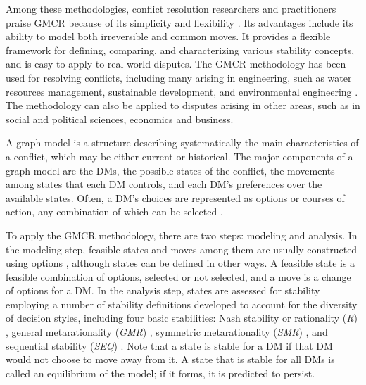 Among these methodologies, conflict resolution researchers and practitioners praise GMCR because of its simplicity and flexibility \citep{Kilgour&Hipel2005}. Its advantages include its ability to model both irreversible and common moves. It provides a flexible framework for defining, comparing, and characterizing various stability concepts, and is easy to apply to real-world disputes. The GMCR methodology has been used for resolving conflicts, including many arising in engineering, such as water resources management, sustainable development, and environmental engineering \citep{Hipel-et-al2001, Hipel-et-al2008a, Hipel-et-al2008b, Hipel&Obeidi2005, Kilgour&Hipel2005}. The methodology can also be applied to disputes arising in other areas, such as in social and political sciences, economics and business.

A graph model is a structure describing systematically the main characteristics of a conflict, which may be either current or historical. The major components of a graph model are the DMs, the possible states of the conflict, the movements among states that each DM controls, and each DM's preferences over the available states. Often, a DM's choices are represented as options or courses of action, any combination of which can be selected \citep{Howard1971, Kilgour-et-al1987, Fang-et-al1993}.

To apply the GMCR methodology, there are two steps: modeling and analysis. In the modeling step, feasible states and moves among them are usually constructed using options \citep{Kilgour-et-al1987, Fang-et-al1993}, although states can be defined in other ways. A feasible state is a feasible combination of options, selected or not selected, and a move is a change of options for a DM. In the analysis step, states are assessed for stability employing a number of stability definitions developed to account for the diversity of decision styles, including four basic stabilities: Nash stability or rationality (\emph{R}) \citep{Nash1950, Nash1951}, general metarationality (\emph{GMR}) \citep{Howard1971}, symmetric metarationality (\emph{SMR}) \citep{Howard1971}, and sequential stability (\emph{SEQ}) \citep{Fraser&Hipel1984}. Note that a state is stable for a DM if that DM would not choose to move away from it. A state that is stable for all DMs is called an equilibrium of the model; if it forms, it is predicted to persist.


